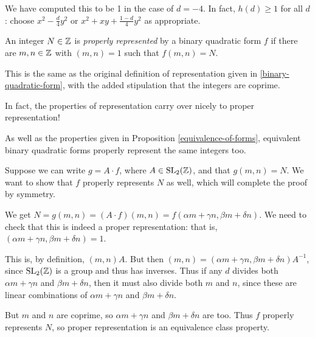 \documentclass{article}
\begin{document}
We have computed this to be 1 in the case of $d = -4$. In fact, $h(d) \geq 1$ for all $d$: choose $x^2 - \frac{d}{4} y^2$ or $x^2 + xy + \frac{1-d}{4}y^2$ as appropriate.

\begin{definition}
	An integer $N \in \mathbb{Z}$ is \textit{properly represented} by a binary quadratic form $f$ if there are $m, n \in \mathbb{Z}$ with $(m, n) = 1$ such that $f(m, n) = N$.
\end{definition}

\begin{note}
	This is the same as the original definition of representation given in \ref{binary-quadratic-form}, with the added stipulation that the integers are coprime.
\end{note}

In fact, the properties of representation carry over nicely to proper representation!

\begin{proposition}
	As well as the properties given in Proposition \ref{equivalence-of-forms}, equivalent binary quadratic forms properly represent the same integers too.
\end{proposition}

\begin{prf}
    Suppose we can write $g = A \cdot f$, where $A \in \mathrm{SL}_2(\mathbb{Z})$, and that $g(m, n) = N$.
    We want to show that $f$ properly represents $N$ as well, which will complete the proof by symmetry.
    
    We get $N = g(m, n) = (A \cdot f)(m, n) = f(\alpha m + \gamma n, \beta m + \delta n)$.
    We need to check that this is indeed a proper representation: that is, $(\alpha m + \gamma n, \beta m + \delta n) = 1$.
    
    This is, by definition, $(m, n)A$.
    But then $(m, n) = (\alpha m + \gamma n, \beta m + \delta n) A^{-1}$, since $\mathrm{SL}_2(\mathbb{Z})$ is a group and thus has inverses.
    Thus if any $d$ divides both $\alpha m + \gamma n$ and $\beta m + \delta n$, then it must also divide both $m$ and $n$, since these are linear combinations of $\alpha m + \gamma n$ and $\beta m + \delta n$.
    
    But $m$ and $n$ are coprime, so $\alpha m + \gamma n$ and $\beta m + \delta n$ are too. Thus $f$ properly represents $N$, so proper representation is an equivalence class property.
\end{prf}
\end{document}
